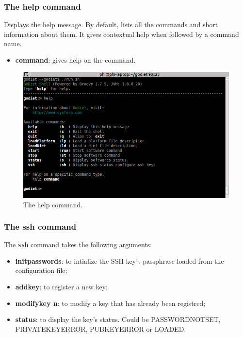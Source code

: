 \subsubsection{The help command}

Displays the help message. By default, lists all the commands and short information about them. It gives contextual help when followed by a command name.

\begin{itemize}
  \item \textbf{command}: gives help on the command.
\end{itemize}

\begin{figure}[h]
  \centering
  \includegraphics[width=12cm]{fig/2-helpcommand}
  \caption{The help command.\label{fig:GODIETHelp}}
\end{figure}

\subsubsection{The ssh command}
\label{GODIETSSHCommand}

The \verb+ssh+ command takes the following arguments:

\begin{itemize}
\item \textbf{initpasswords}: to intialize the SSH key's passphrase loaded from the configuration file;
\item \textbf{addkey}: to register a new key;
\item \textbf{modifykey n}: to modify a key that has already been registred;
\item \textbf{status}: to display the key's status. Could be PASSWORDNOTSET, PRIVATEKEYERROR, PUBKEYERROR or LOADED.
\end{itemize}

